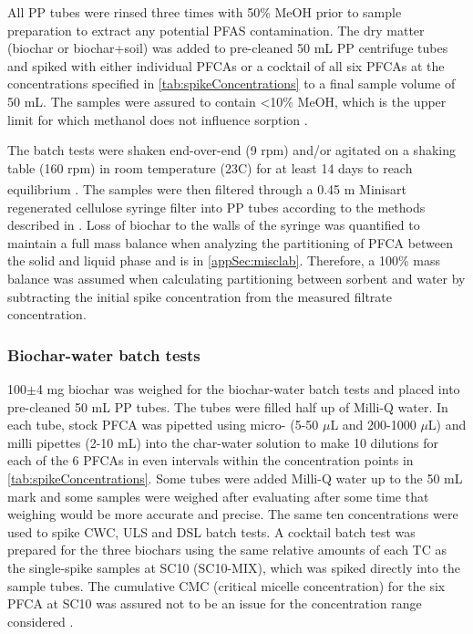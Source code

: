 All PP tubes were rinsed three times with 50\% MeOH prior to sample preparation to extract any potential PFAS contamination. The dry matter (biochar or biochar+soil) was added to pre-cleaned 50 mL PP centrifuge tubes and spiked with either individual PFCAs or a cocktail of all six PFCAs at the concentrations specified in \cref{tab:spikeConcentrations} to a final sample volume of 50 mL. The samples were assured to contain \textless 10\% MeOH, which is the upper limit for which methanol does not influence sorption \citep{arvaniti2014}. 

The batch tests were shaken end-over-end (9 rpm) and/or agitated on a shaking table (160 rpm) in room temperature (23\textdegree C) for at least 14 days to reach equilibrium \citep{higgins2006sorption}. The samples were then filtered through a 0.45 \textmu m Minisart\textsuperscript{\textregistered} regenerated cellulose syringe filter into PP tubes according to the methods described in \cite{Sorengard2019}. Loss of biochar to the walls of the syringe was quantified to maintain a full mass balance when analyzing the partitioning of PFCA between the solid and liquid phase and is in \cref{appSec:misclab}. Therefore, a 100\% mass balance was assumed when calculating partitioning between sorbent and water by subtracting the initial spike concentration from the measured filtrate concentration.  



\subsubsection{Biochar-water batch tests}
100$\pm$4 mg biochar was weighed for the biochar-water batch tests and placed into pre-cleaned 50 mL PP tubes. The tubes were filled half up of Milli-Q water. In each tube, stock PFCA was pipetted using micro- (5-50 $\mu$L and 200-1000 $\mu$L) and milli pipettes (2-10 mL) into the char-water solution to make 10 dilutions for each of the 6 PFCAs in even intervals within the concentration points in \cref{tab:spikeConcentrations}. Some tubes were added Milli-Q water up to the 50 mL mark and some samples were weighed after evaluating after some time that weighing would be more accurate and precise. The same ten concentrations were used to spike CWC, ULS and DSL batch tests. A cocktail batch test was prepared for the three biochars using the same relative amounts of each TC as the single-spike samples at SC10 (SC10-MIX), which was spiked directly into the sample tubes. The cumulative CMC (critical micelle concentration) for the six PFCA at SC10 was assured not to be an issue for the concentration range considered \citep{bhhatarai2011,ding2013physicochemical}.

